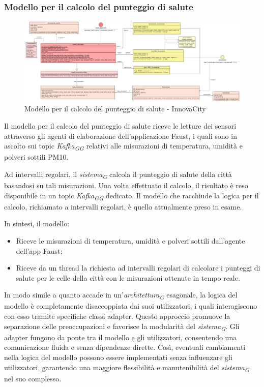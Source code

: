 \subsubsection{Modello per il calcolo del punteggio di salute}
\begin{figure}[H]
    \centering
    \includegraphics[width=1\textwidth]{../Images/SpecificaTecnica/healthModel.PNG}
    \caption{Modello per il calcolo del punteggio di salute - InnovaCity}
    \label{fig: healthModello}
\end{figure}

Il modello per il calcolo del punteggio di salute riceve le letture dei sensori attraverso gli agenti di elaborazione dell'applicazione Faust, i quali sono in ascolto sui topic \textit{Kafka}\textsubscript{\textit{G}}\textsubscript{\textit{G}} relativi alle misurazioni di temperatura, umidità e polveri sottili PM10.

Ad intervalli regolari, il \textit{sistema}\textsubscript{\textit{G}} calcola il punteggio di salute della città basandosi su tali misurazioni. Una volta effettuato il calcolo, il risultato è reso disponibile in un topic \textit{Kafka}\textsubscript{\textit{G}}\textsubscript{\textit{G}} dedicato.
Il modello che racchiude la logica per il calcolo, richiamato a intervalli regolari, è quello attualmente preso in esame.

In sintesi, il modello:
\begin{itemize}
    \item Riceve le misurazioni di temperatura, umidità e polveri sottili dall'agente dell'app Faust;
    \item Riceve da un thread la richiesta ad intervalli regolari di calcolare i punteggi di salute per le celle della città con le misurazioni ottenute in tempo reale.
\end{itemize}

In modo simile a quanto accade in un'\textit{architettura}\textsubscript{\textit{G}} esagonale, la logica del modello è completamente disaccoppiata dai suoi utilizzatori, i quali interagiscono con esso tramite specifiche classi adapter. Questo approccio promuove la separazione delle preoccupazioni e favorisce la modularità del \textit{sistema}\textsubscript{\textit{G}}. Gli adapter fungono da ponte tra il modello e gli utilizzatori, consentendo una comunicazione fluida e senza dipendenze dirette. Così, eventuali cambiamenti nella logica del modello possono essere implementati senza influenzare gli utilizzatori, garantendo una maggiore flessibilità e manutenibilità del \textit{sistema}\textsubscript{\textit{G}} nel suo complesso.

